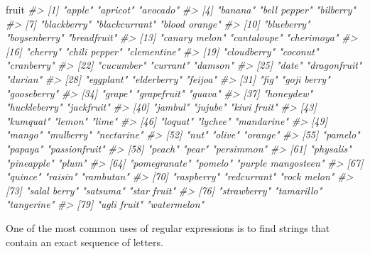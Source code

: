 \documentclass[]{book}
\newenvironment{Shaded}{\begin{snugshade}}{\end{snugshade}}
\newcommand{\CommentTok}[1]{\textcolor[rgb]{0.56,0.35,0.01}{\textit{#1}}}
\newcommand{\NormalTok}[1]{#1}
\theoremstyle{definition}
\theoremstyle{definition}
\theoremstyle{definition}
\theoremstyle{remark}
\begin{document}
\begin{Shaded}
\begin{Highlighting}[]
\NormalTok{fruit}
\CommentTok{#>  [1] "apple"             "apricot"           "avocado"          }
\CommentTok{#>  [4] "banana"            "bell pepper"       "bilberry"         }
\CommentTok{#>  [7] "blackberry"        "blackcurrant"      "blood orange"     }
\CommentTok{#> [10] "blueberry"         "boysenberry"       "breadfruit"       }
\CommentTok{#> [13] "canary melon"      "cantaloupe"        "cherimoya"        }
\CommentTok{#> [16] "cherry"            "chili pepper"      "clementine"       }
\CommentTok{#> [19] "cloudberry"        "coconut"           "cranberry"        }
\CommentTok{#> [22] "cucumber"          "currant"           "damson"           }
\CommentTok{#> [25] "date"              "dragonfruit"       "durian"           }
\CommentTok{#> [28] "eggplant"          "elderberry"        "feijoa"           }
\CommentTok{#> [31] "fig"               "goji berry"        "gooseberry"       }
\CommentTok{#> [34] "grape"             "grapefruit"        "guava"            }
\CommentTok{#> [37] "honeydew"          "huckleberry"       "jackfruit"        }
\CommentTok{#> [40] "jambul"            "jujube"            "kiwi fruit"       }
\CommentTok{#> [43] "kumquat"           "lemon"             "lime"             }
\CommentTok{#> [46] "loquat"            "lychee"            "mandarine"        }
\CommentTok{#> [49] "mango"             "mulberry"          "nectarine"        }
\CommentTok{#> [52] "nut"               "olive"             "orange"           }
\CommentTok{#> [55] "pamelo"            "papaya"            "passionfruit"     }
\CommentTok{#> [58] "peach"             "pear"              "persimmon"        }
\CommentTok{#> [61] "physalis"          "pineapple"         "plum"             }
\CommentTok{#> [64] "pomegranate"       "pomelo"            "purple mangosteen"}
\CommentTok{#> [67] "quince"            "raisin"            "rambutan"         }
\CommentTok{#> [70] "raspberry"         "redcurrant"        "rock melon"       }
\CommentTok{#> [73] "salal berry"       "satsuma"           "star fruit"       }
\CommentTok{#> [76] "strawberry"        "tamarillo"         "tangerine"        }
\CommentTok{#> [79] "ugli fruit"        "watermelon"}
\end{Highlighting}
\end{Shaded}

One of the most common uses of regular expressions is to find strings
that contain an exact sequence of letters.
\end{document}
